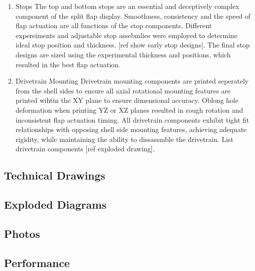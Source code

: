 \documentclass[11pt]{article}
\begin{document}
\begin{enumerate}
\item Stops
\label{sec:org4a3151c}
The top and bottom stops are an essential and deceptively complex component of the split flap display. Smoothness, consistency and the speed of flap actuation are all functions of the stop components. Different expereiments and adjustable stop assebmlies were employed to determine ideal stop position and thickness. [ref show early stop designs]. The final stop designs are sized using the experimental thickness and positions, which resulted in the best flap actuation.

\item Drivetrain Mounting
\label{sec:org0896266}
Drivetrain mounting components are printed seperately from the shell sides to ensure all axial rotational mounting features are printed wihtin the XY plane to ensure dimensional accuracy. Oblong hole deformation when printing YZ or XZ planes resulted in rough rotation and inconsistent flap actuation timing. All drivetrain components exhibit tight fit relationships with opposing shell side mounting features, achieving adequate rigidity, while maintaining the ability to dissassmble the drivetrain. List drivetrain components [ref exploded drawing].
\end{enumerate}

\subsection{Technical Drawings}
\label{sec:org2c1c70b}

\subsection{Exploded Diagrams}
\label{sec:orga913618}

\subsection{Photos}
\label{sec:orgcd1c263}

\subsection{Performance}
\label{sec:orgdae3635}
\end{document}
